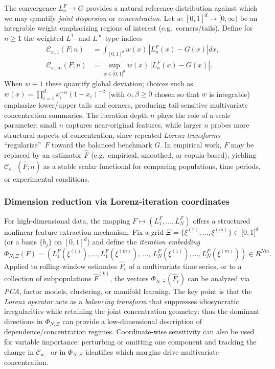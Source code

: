 \documentclass[onecolumn]{article}
\begin{document}
The convergence $L_{n}^{F}\rightarrow G$ provides a natural reference
distribution against which we may quantify \textit{joint dispersion} or 
\textit{concentration}. Let $w:[0,1]^{d}\rightarrow \lbrack 0,\infty )$ be
an integrable weight emphasizing regions of interest (e.g.\ corners/tails).
Define for $n\geq 1$ the weighted $L^{1}$- and $L^{\infty }$-type indices 
\begin{align}
\mathcal{C}_{w,1}(F;n)& =\int_{[0,1]^{d}}w(x)\,\left\vert
L_{n}^{F}(x)-G(x)\right\vert dx,  \label{2078} \\
\mathcal{C}_{w,\infty }(F;n)& =\sup_{x\in \lbrack 0,1]^{d}}w(x)\,\left\vert
L_{n}^{F}(x)-G(x)\right\vert .  \label{2079}
\end{align}%
When $w\equiv 1$ these quantify global deviation; choices such as $%
w(x)=\prod_{i=1}^{d}x_{i}^{-\alpha }(1-x_{i})^{-\beta }$ (with $\alpha
,\beta \geq 0$ chosen so that $w$ is integrable) emphasize lower/upper tails
and corners, producing tail-sensitive multivariate concentration summaries.
The iteration depth $n$ plays the role of a scale parameter: small $n$
captures near-original features, while larger $n$ probes more structural
aspects of concentration, since repeated \textit{Lorenz transforms}
\textquotedblleft regularize\textquotedblright\ $F$ toward the balanced
benchmark $G$. In empirical work, $F$ may be replaced by an estimator $%
\widehat{F}$ (e.g.\ empirical, smoothed, or copula-based), yielding $%
\mathcal{C}_{w,\cdot }(\widehat{F};n)$ as a stable scalar functional for
comparing populations, time periods, or experimental conditions.

\subsubsection{Dimension reduction via Lorenz-iteration coordinates}

For high-dimensional data, the mapping $F\mapsto (L_{1}^{F},\dots
,L_{N}^{F}) $ offers a structured nonlinear feature extraction mechanism.
Fix a grid $\Xi =\{\xi ^{(1)},\dots ,\xi ^{(m)}\}\subset \lbrack 0,1]^{d}$
(or a basis $\{b_{j}\}$ on $[0,1]^{d}$) and define the \textit{iteration
embedding} 
\begin{equation}
\Phi _{N,\Xi }(F)=(L_{1}^{F}(\xi ^{(1)}),\dots ,L_{1}^{F}(\xi
^{(m)}),\,\dots ,\,L_{N}^{F}(\xi ^{(1)}),\dots ,L_{N}^{F}(\xi ^{(m)}))\in
R^{Nm}.  \label{2080}
\end{equation}%
Applied to rolling-window estimates $\widehat{F}_{t}$ of a multivariate time
series, or to a collection of subpopulations $\widehat{F}^{(k)}$, the
vectors $\Phi _{N,\Xi }(\widehat{F}_{t})$ can be analyzed via \textit{PCA},
factor models, clustering, or manifold learning. The key point is that the 
\textit{Lorenz operator} acts as a \textit{balancing transform} that
suppresses idiosyncratic irregularities while retaining the joint
concentration geometry: thus the dominant directions in $\Phi _{N,\Xi }$ can
provide a low-dimensional description of dependence/concentration regimes.
Coordinate-wise sensitivity can also be used for variable importance:
perturbing or omitting one component and tracking the change in $\mathcal{C}%
_{w,\cdot }$ or in $\Phi _{N,\Xi }$ identifies which margins drive
multivariate concentration.
\end{document}
